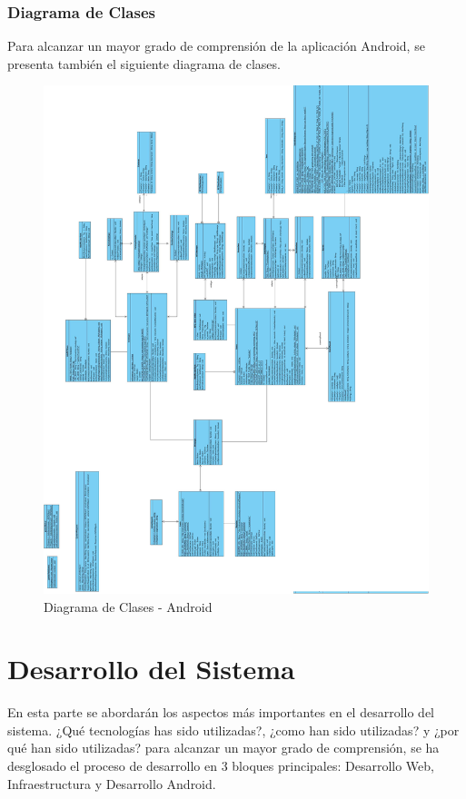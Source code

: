 \documentclass[a4paper,11pt]{book}
\begin{document}
\subsection{Diagrama de Clases}
Para alcanzar un mayor grado de comprensión de la aplicación Android, se presenta también el siguiente diagrama de clases. 
\begin{figure}[H] 
\centering 
\includegraphics[scale=0.20]{imagenes/clases/clasesAndroid.jpg}
\caption{ Diagrama de Clases - Android\cite{diagrama}  }  
\end{figure}




\chapter{Desarrollo del Sistema}
En esta parte se abordarán los aspectos más importantes en el desarrollo del sistema. ¿Qué tecnologías has sido utilizadas?, ¿como han sido utilizadas? y ¿por qué han sido utilizadas?
para alcanzar un mayor grado de comprensión, se ha desglosado el proceso de desarrollo en 3 bloques principales: Desarrollo Web, Infraestructura y Desarrollo Android. 
\end{document}
